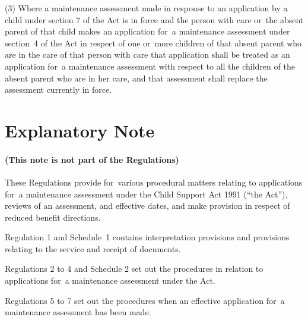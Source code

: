 \documentclass[a4paper,12pt]{article}
\begin{document}
(3) Where a maintenance assessment made in response to an application by a child under section 7 of the Act is in force and the person with care 
or~the absent parent  %
of that child makes an application for~a maintenance assessment under section~4 of the Act in respect of 
one or~more 
  children of that absent parent who are in the care of that person with care  %
that application shall be treated as an application for~a maintenance assessment with respect to all the children of the absent parent who are in her care, and %
that assessment shall replace the assessment currently in force.%


\part{Explanatory Note}

\renewcommand\parthead{--- Explanatory Note}

\subsection*{(This note is not part of the Regulations)}

 These Regulations provide for~various procedural matters relating to applications for~a maintenance assessment under the Child Support Act 1991 (“the Act”), reviews of an assessment, and effective dates, and make provision in respect of reduced benefit directions.

  Regulation 1 and Schedule~1 contains interpretation provisions and provisions relating to the service and receipt of documents.

  Regulations 2 to 4 and Schedule 2 set out the procedures in relation to applications for~a maintenance assessment under the Act.

  Regulations 5 to 7 set out the procedures when an effective application for~a maintenance assessment has been made.
\end{document}
